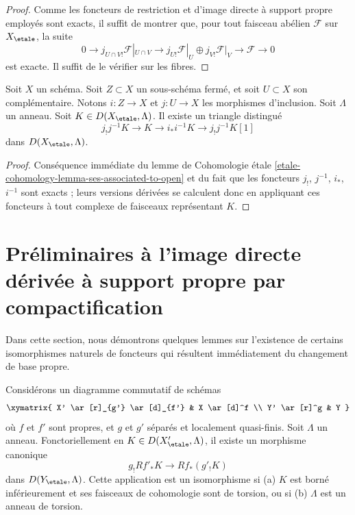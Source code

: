 \begin{proof}
Comme les foncteurs de restriction et d'image directe à support propre employés
sont exacts, il suffit de montrer que, pour tout faisceau abélien $\mathcal{F}$ sur
$X_\etale$, la suite
$$
0 \to j_{U \cap V!}\mathcal{F}|_{U \cap V} \to
j_{U!}\mathcal{F}|_U \oplus j_{V!}\mathcal{F}|_V \to \mathcal{F} \to 0
$$
est exacte. Il suffit de le vérifier sur les fibres.
\end{proof}

\begin{lemma}
\label{lemma-triangle-associated-to-open}
Soit $X$ un schéma. Soit $Z \subset X$ un sous-schéma fermé, et soit
$U \subset X$ son complémentaire. Notons $i : Z \to X$ et $j : U \to X$
les morphismes d'inclusion. Soit $\Lambda$ un anneau.
Soit $K \in D(X_\etale, \Lambda)$. Il existe un triangle distingué
$$
j_!j^{-1}K \to K \to i_*i^{-1}K \to j_!j^{-1}K[1]
$$
dans $D(X_\etale, \Lambda)$.
\end{lemma}

\begin{proof}
Conséquence immédiate du lemme de Cohomologie étale
\ref{etale-cohomology-lemma-ses-associated-to-open}
et du fait que les foncteurs $j_!$, $j^{-1}$, $i_*$, $i^{-1}$
sont exacts ; leurs versions dérivées se calculent donc en
appliquant ces foncteurs à tout complexe de faisceaux représentant $K$.
\end{proof}





\section{Préliminaires à l'image directe dérivée à support propre par compactification}
\label{section-prelim}

\noindent
Dans cette section, nous démontrons quelques lemmes sur l'existence
de certains isomorphismes naturels de foncteurs qui résultent immédiatement
du changement de base propre.

\begin{lemma}
\label{lemma-shriek-proper-and-open}
Considérons un diagramme commutatif de schémas
$$
\xymatrix{
X' \ar[r]_{g'} \ar[d]_{f'} & X \ar[d]^f \\
Y' \ar[r]^g & Y
}
$$
où $f$ et $f'$ sont propres, et $g$ et $g'$ séparés et localement quasi-finis.
Soit $\Lambda$ un anneau. Fonctoriellement en $K \in D(X'_\etale, \Lambda)$,
il existe un morphisme canonique
$$
g_!Rf'_*K \longrightarrow Rf_*(g'_!K)
$$
dans $D(Y_\etale, \Lambda)$. Cette application est un isomorphisme si
(a) $K$ est borné inférieurement et ses faisceaux de cohomologie sont de torsion, ou si
(b) $\Lambda$ est un anneau de torsion.
\end{lemma}

